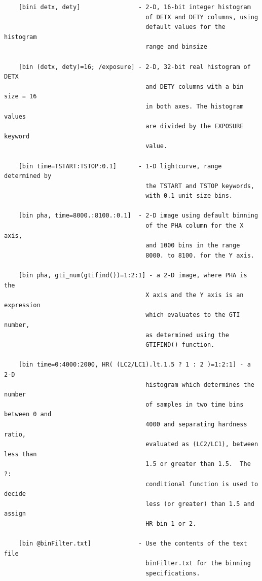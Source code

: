 \documentclass[11pt]{book}
\begin{document}
\begin{verbatim}
    [bini detx, dety]                - 2-D, 16-bit integer histogram
                                       of DETX and DETY columns, using
                                       default values for the histogram
                                       range and binsize

    [bin (detx, dety)=16; /exposure] - 2-D, 32-bit real histogram of DETX
                                       and DETY columns with a bin size = 16
                                       in both axes. The histogram values
                                       are divided by the EXPOSURE keyword
                                       value.

    [bin time=TSTART:TSTOP:0.1]      - 1-D lightcurve, range determined by
                                       the TSTART and TSTOP keywords,
                                       with 0.1 unit size bins.

    [bin pha, time=8000.:8100.:0.1]  - 2-D image using default binning
                                       of the PHA column for the X axis,
                                       and 1000 bins in the range
                                       8000. to 8100. for the Y axis.

    [bin pha, gti_num(gtifind())=1:2:1] - a 2-D image, where PHA is the
                                       X axis and the Y axis is an expression
                                       which evaluates to the GTI number,
                                       as determined using the
                                       GTIFIND() function.

    [bin time=0:4000:2000, HR( (LC2/LC1).lt.1.5 ? 1 : 2 )=1:2:1] - a 2-D
                                       histogram which determines the number
                                       of samples in two time bins between 0 and
                                       4000 and separating hardness ratio,
                                       evaluated as (LC2/LC1), between less than
                                       1.5 or greater than 1.5.  The ?:
                                       conditional function is used to decide
                                       less (or greater) than 1.5 and assign
                                       HR bin 1 or 2.

    [bin @binFilter.txt]             - Use the contents of the text file
                                       binFilter.txt for the binning
                                       specifications.

\end{verbatim}
\end{document}
